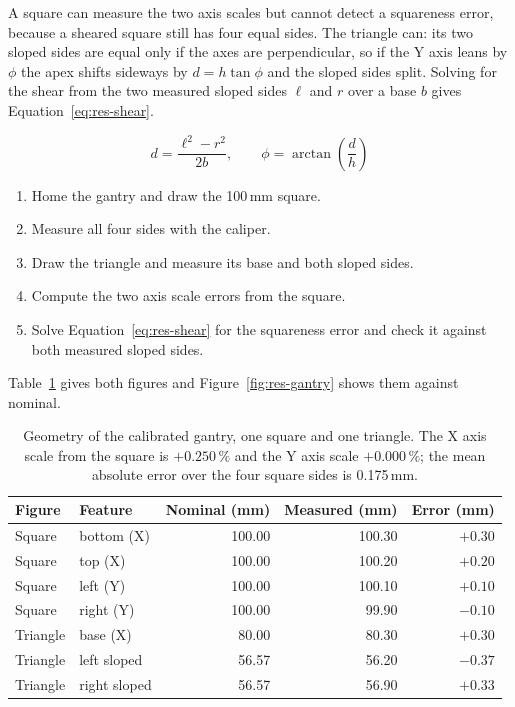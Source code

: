         A square can measure the two axis scales but cannot detect a squareness
        error, because a sheared square still has four equal sides. The triangle
        can: its two sloped sides are equal only if the axes are perpendicular,
        so if the Y axis leans by $\phi$ the apex shifts sideways by
        $d = h\tan\phi$ and the sloped sides split. Solving for the shear from
        the two measured sloped sides $\ell$ and $r$ over a base $b$ gives
        Equation~\ref{eq:res-shear}.

\begin{equation}
d = \frac{\ell^{2}-r^{2}}{2b}, \qquad \phi = \arctan\!\left(\frac{d}{h}\right)
\label{eq:res-shear}
\end{equation}

        \medskip

        \begin{enumerate}
        \item Home the gantry and draw the 100\,mm square.
        \item Measure all four sides with the caliper.
        \item Draw the triangle and measure its base and both sloped sides.
        \item Compute the two axis scale errors from the square.
        \item Solve Equation~\ref{eq:res-shear} for the squareness error and
              check it against both measured sloped sides.
        \end{enumerate}

        \medskip

        Table~\ref{tab:res-r5} gives both figures and
        Figure~\ref{fig:res-gantry} shows them against nominal.

\begin{table}[h]
\centering
\fontsize{10}{12}\selectfont
\begin{tabular}{|l|l|r|r|r|}
\hline
\textbf{Figure} & \textbf{Feature} & \textbf{Nominal (mm)} & \textbf{Measured (mm)} & \textbf{Error (mm)} \\
\hline
Square   & bottom (X)   & 100.00 & 100.30 & $+0.30$ \\
Square   & top (X)      & 100.00 & 100.20 & $+0.20$ \\
Square   & left (Y)     & 100.00 & 100.10 & $+0.10$ \\
Square   & right (Y)    & 100.00 &  99.90 & $-0.10$ \\
\hline
Triangle & base (X)     &  80.00 &  80.30 & $+0.30$ \\
Triangle & left sloped  &  56.57 &  56.20 & $-0.37$ \\
Triangle & right sloped &  56.57 &  56.90 & $+0.33$ \\
\hline
\end{tabular}
\caption{Geometry of the calibrated gantry, one square and one triangle. The X
axis scale from the square is $+0.250\,\%$ and the Y axis scale
$+0.000\,\%$; the mean absolute error over the four square sides is 0.175\,mm.}
\label{tab:res-r5}
\end{table}

